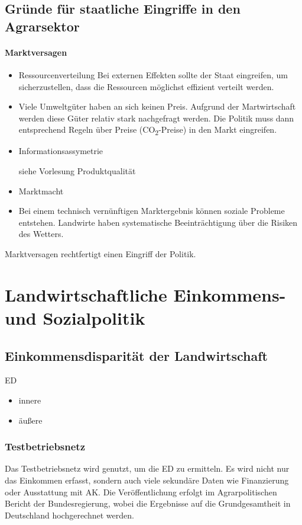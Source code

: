 \documentclass[11pt]{scrbook}
\begin{document}
\subsection{Gründe für staatliche Eingriffe in den Agrarsektor}

\paragraph{Marktversagen} 
\begin{itemize}
	\item Ressourcenverteilung
		Bei externen Effekten sollte der Staat eingreifen, um sicherzustellen, dass die Ressourcen möglichst effizient verteilt werden.

	\item Viele Umweltgüter haben an sich keinen Preis.
Aufgrund der Martwirtschaft werden diese Güter relativ stark nachgefragt werden.
Die Politik muss dann entsprechend Regeln über Preise (CO\textsubscript{2}-Preise) in den Markt eingreifen.

\item Informationsassymetrie
	
	siehe Vorlesung Produktqualität

\item Marktmacht

\item Bei einem technisch vernünftigen Marktergebnis können soziale Probleme entstehen.
	Landwirte haben systematische Beeinträchtigung über die Risiken des Wetters.
\end{itemize}

Marktversagen rechtfertigt einen Eingriff der Politik.


\section{Landwirtschaftliche Einkommens- und Sozialpolitik}
\subsection{Einkommensdisparität der Landwirtschaft}
\acl{ED}
\begin{itemize}
	\item innere
	\item äußere
\end{itemize}

\subsubsection{Testbetriebsnetz}
Das Testbetriebsnetz wird genutzt, um die \ac{ED} zu ermitteln.
Es wird nicht nur das Einkommen erfasst, sondern auch viele sekundäre Daten wie Finanzierung oder Ausstattung mit AK.
Die Veröffentlichung erfolgt im \glqq Agrarpolitischen Bericht der Bundesregierung\grqq{}, wobei die Ergebnisse auf die Grundgesamtheit in Deutschland hochgerechnet werden.
\end{document}
